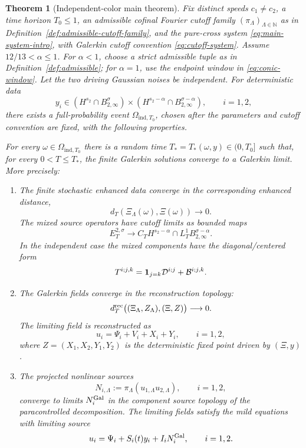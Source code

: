 \documentclass[10pt]{amsart}
\numberwithin{equation}{section}
\theoremstyle{plain}
\newtheorem{theorem}{Theorem}[section]
\theoremstyle{definition}
\theoremstyle{remark}
\begin{document}
\begin{theorem}[Independent-color main theorem]\label{thm:main}
\normalfont
Fix distinct speeds \(c_1\ne c_2\), a time horizon \(T_0\le1\), an admissible cofinal Fourier cutoff family \((\pi_\Lambda)_{\Lambda\in\mathbb N}\) as in Definition~\ref{def:admissible-cutoff-family}, and the pure-cross system \eqref{eq:main-system-intro}, with Galerkin cutoff convention \eqref{eq:cutoff-system}.  Assume \(12/13<\alpha\le1\).  For \(\alpha<1\), choose a strict admissible tuple as in Definition~\ref{def:admissible}; for \(\alpha=1\), use the endpoint window in \eqref{eq:conic-window}.  Let the two driving Gaussian noises be independent.
For deterministic data
\[
        y_i\in (H^{s_2}\cap B_{2,\infty}^{\sigma})
        \times (H^{s_2-\alpha}\cap B_{2,\infty}^{\sigma-\alpha}),
        \qquad i=1,2,
\]
there exists a full-probability event \(\Omega_{\mathrm{ind},T_0}\), chosen after the parameters and cutoff convention are fixed, with the following properties.

For every \(\omega\in\Omega_{\mathrm{ind},T_0}\) there is a random time \(T_\ast=T_\ast(\omega,y)\in(0,T_0]\) such that, for every \(0<T\le T_\ast\), the finite Galerkin solutions converge to a Galerkin limit.  More precisely:
\begin{enumerate}[label=\textup{(\roman*)},leftmargin=2.2em]
\item The finite stochastic enhanced data converge in the corresponding enhanced distance,
\[
        d_T(\Xi_\Lambda(\omega),\Xi(\omega))\longrightarrow0.
\]
The mixed source operators have cutoff limits as bounded maps
\[
        E_T^{2,\sigma}\longrightarrow
        C_TH^{s_2-\alpha}\cap L_T^1B_{2,\infty}^{\sigma-\alpha}.
\]
In the independent case the mixed components have the diagonal/centered form
\[
        T^{i;j,k}={\bf 1}_{j=k}\mathcal D^{i;j}+\mathcal B^{i;j,k}.
\]

\item The Galerkin fields converge in the reconstruction topology:
\[
        d_T^{\rm rec}
        \bigl((\Xi_\Lambda,Z_\Lambda),(\Xi,Z)\bigr)\longrightarrow0.
\]
The limiting field is reconstructed as
\[
        u_i=\Psi_i+V_i+X_i+Y_i,
        \qquad i=1,2,
\]
where \(Z=(X_1,X_2,Y_1,Y_2)\) is the deterministic fixed point driven by \((\Xi,y)\).

\item The projected nonlinear sources
\[
        N_{i,\Lambda}
        :=\pi_\Lambda(u_{1,\Lambda}u_{2,\Lambda}),
        \qquad i=1,2,
\]
converge to limits \(N_i^{\rm Gal}\) in the component source topology of the paracontrolled decomposition.  The limiting fields satisfy the mild equations with limiting source
\[
        u_i=\Psi_i+S_i(t)y_i+I_iN_i^{\rm Gal},
        \qquad i=1,2.
\]


\end{enumerate}
\end{theorem}
\end{document}
